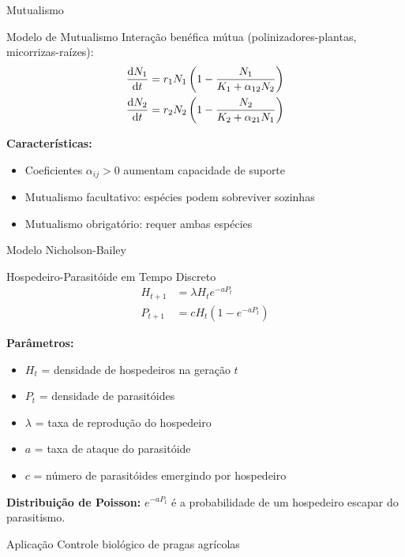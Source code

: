 \begin{frame}{Mutualismo}
\begin{block}{Modelo de Mutualismo}
Interação benéfica mútua (polinizadores-plantas, micorrizas-raízes):
\begin{align*}
\frac{\mathrm{d} N_1}{\mathrm{d} t} &= r_1 N_1\left(1 - \frac{N_1}{K_1 + \alpha_{12}N_2}\right)\\
\frac{\mathrm{d} N_2}{\mathrm{d} t} &= r_2 N_2\left(1 - \frac{N_2}{K_2 + \alpha_{21}N_1}\right)
\end{align*}
\end{block}

\textbf{Características:}
\begin{itemize}
    \item Coeficientes $\alpha_{ij} > 0$ aumentam capacidade de suporte
    \item Mutualismo facultativo: espécies podem sobreviver sozinhas
    \item Mutualismo obrigatório: requer ambas espécies
\end{itemize}

\end{frame}

\begin{frame}{Modelo Nicholson-Bailey}
\begin{block}{Hospedeiro-Parasitóide em Tempo Discreto}
\begin{align*}
H_{t+1} &= \lambda H_t e^{-aP_t}\\
P_{t+1} &= c H_t (1 - e^{-aP_t})
\end{align*}

\textbf{Parâmetros:}
\begin{itemize}
    \item $H_t$ = densidade de hospedeiros na geração $t$
    \item $P_t$ = densidade de parasitóides
    \item $\lambda$ = taxa de reprodução do hospedeiro
    \item $a$ = taxa de ataque do parasitóide
    \item $c$ = número de parasitóides emergindo por hospedeiro
\end{itemize}
\end{block}

\textbf{Distribuição de Poisson:} $e^{-aP_t}$ é a probabilidade de um hospedeiro escapar do parasitismo.

\begin{exampleblock}{Aplicação}
Controle biológico de pragas agrícolas
\end{exampleblock}
\end{frame}

